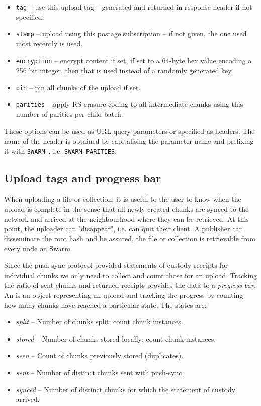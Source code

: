 \begin{itemize}[noitemsep]
\item \lstinline{tag} -- use this upload tag -- generated and returned in response header if not specified. 
\item \lstinline{stamp} -- upload using this postage subscription -- if not given, the one used most recently is used. 
\item \lstinline{encryption} -- encrypt content if set, if set to a 64-byte hex value encoding a 256 bit integer, then that is used instead of a randomly generated key. 
\item \lstinline{pin} -- pin all chunks of the upload if set. 
\item \lstinline{parities} -- apply RS erasure coding to all intermediate chunks using this number of parities per child batch.
\end{itemize}

These options can be used as URL query parameters or specified as  headers. The name of the header is obtained by capitalising the parameter name and prefixing it with \lstinline{SWARM-},  i.e. \lstinline{SWARM-PARITIES}.  


\subsection{Upload tags and progress bar \statusgreen}\label{sec:tags}                                                                                        
When uploading a file or collection, it is useful to the user to know when the upload is complete in the sense that all newly created chunks are synced to the network and arrived at the neighbourhood where they can be retrieved. At this point, the uploader can "disappear", i.e. can quit their client. A publisher can disseminate the root hash and be assured, the file or collection is retrievable from every node on Swarm. 

Since the push-sync protocol provided statements of custody receipts for individual chunks we only need to collect and count those for an upload. Tracking the ratio of sent chunks and returned receipts provides the data to a \emph{progress bar}. An  is an object representing an upload and tracking the progress by counting how many chunks have reached a particular state. The states are: 

\begin{itemize}[noitemsep]
\item \emph{split} -- Number of chunks split; count chunk instances.
\item \emph{stored} -- Number of chunks stored locally; count chunk instances.
\item \emph{seen} -- Count of chunks previously stored (duplicates).
\item \emph{sent} -- Number of distinct chunks sent with push-sync.
\item \emph{synced} -- Number of distinct chunks for which the statement of custody arrived.
\end{itemize}

